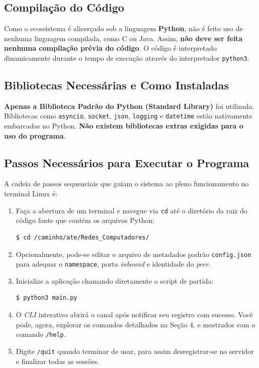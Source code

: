 \documentclass[12pt,a4paper]{article}
\begin{document}
\subsection{Compilação do Código}
Como o ecossistema é alicerçado sob a linguagem \textbf{Python}, não é feito uso de nenhuma linguagem compilada, como C ou Java. Assim, \textbf{não deve ser feita nenhuma compilação prévia do código}. O código é interpretado dinamicamente durante o tempo de execução através do interpretador \texttt{python3}.

\subsection{Bibliotecas Necessárias e Como Instaladas}
\textbf{Apenas a Biblioteca Padrão do Python (Standard Library)} foi utilizada. Bibliotecas como \texttt{asyncio}, \texttt{socket}, \texttt{json}, \texttt{logging} e \texttt{datetime} estão nativamente embarcadas no Python. \textbf{Não existem bibliotecas extras exigidas para o uso do programa}.

\subsection{Passos Necessários para Executar o Programa}
A cadeia de passos sequenciais que guiam o sistema ao pleno funcionamento no terminal Linux é:
\begin{enumerate}
    \item Faça a abertura de um terminal e navegue via \texttt{cd} até o diretório da raiz do código fonte que contém os arquivos Python:
\begin{lstlisting}[language=bash, numbers=none]
$ cd /caminho/ate/Redes_Computadores/
\end{lstlisting}
    \item Opcionalmente, pode-se editar o arquivo de metadados padrão \texttt{config.json} para adequar o \texttt{namespace}, porta \textit{inbound} e identidade do \textit{peer}.
    \item Inicialize a aplicação chamando diretamente o script de partida:
\begin{lstlisting}[language=bash, numbers=none]
$ python3 main.py
\end{lstlisting}
    \item O \textit{CLI} interativo abrirá o canal após notificar seu registro com sucesso. Você pode, agora, explorar os comandos detalhados na Seção 4, e mostrados com o comando \texttt{/help}. 
    \item Digite \texttt{/quit} quando terminar de usar, para assim desregistrar-se no servidor e finalizar todas as sessões.
\end{enumerate}
\end{document}
